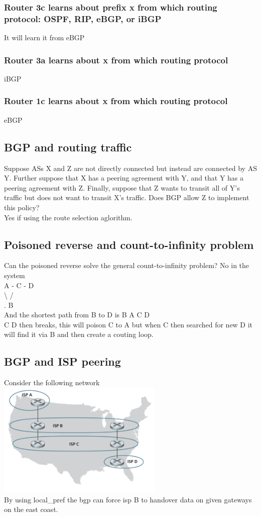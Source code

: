 \documentclass[12pt, a4paper]{article}
\begin{document}
			\subsubsection{Router 3c learns about prefix x from which routing protocol: OSPF, RIP, eBGP, or iBGP}
				It will learn it from eBGP
			\subsubsection{Router 3a learns about x from which routing protocol}
				iBGP
			\subsubsection{Router 1c learns about x from which routing protocol}
				eBGP
		\subsection{BGP and routing traffic}
			Suppose ASs X and Z are not directly connected but instead are connected by AS Y. Further suppose that X has a peering agreement with Y, and that Y has a peering agreement with Z. Finally, suppose that Z wants to transit all of Y’s traffic but does not want to transit X’s traffic. Does BGP allow Z to implement this policy?\\
			Yes if using the route selection aglorithm.
		\subsection{Poisoned reverse and count-to-infinity problem}
			Can the poisoned reverse solve the general count-to-infinity problem?
			No in the system\\
			A - C - D\\
			\;\textbackslash\;\; / \\
			. B\\
			And the shortest path from B to D is B A C D\\
			C D then breaks, this will poison C to A but when C then searched for new D it will find it via B and then create a couting loop.
		\subsection{BGP and ISP peering}
			Consider the following network\\
			\includegraphics[width=300px]{assets/9.5.png}\\
			By using local\_pref the bgp can force isp B to handover data on given gateways on the east coast.
\end{document}
